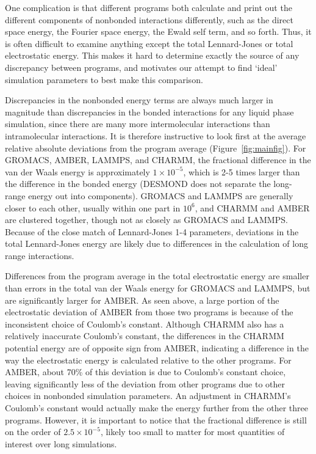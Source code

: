 One complication is that different programs both calculate and print
out the different components of nonbonded interactions differently,
such as the direct space energy, the Fourier space energy, the Ewald
self term, and so forth.  Thus, it is often difficult to examine
anything except the total Lennard-Jones or total electrostatic
energy. This makes it hard to determine exactly the source of any
discrepancy between programs, and motivates our attempt to find
`ideal' simulation parameters to best make this comparison.

Discrepancies in the nonbonded energy terms are always much larger in
magnitude than discrepancies in the bonded interactions for any liquid
phase simulation, since there are many more intermolecular
interactions than intramolecular interactions.  It is therefore
instructive to look first at the average relative absolute deviations
from the program average (Figure~\ref{fig:mainfig}). For GROMACS, AMBER, LAMMPS, and CHARMM, the
fractional difference in the van der Waals energy is approximately
$1\times 10^{-5}$, which is 2-5 times larger than the difference in
the bonded energy (DESMOND does not separate the long-range energy out
into components). GROMACS and LAMMPS are generally closer to each
other, usually within one part in $10^6$, and CHARMM and AMBER are
clustered together, though not as closely as GROMACS and
LAMMPS. Because of the close match of Lennard-Jones 1-4 parameters,
deviations in the total Lennard-Jones energy are likely due to
differences in the calculation of long range interactions.

Differences from the program average in the total electrostatic energy
are smaller than errors in the total van der Waals energy for GROMACS
and LAMMPS, but are significantly larger for AMBER.  As seen above, a
large portion of the electrostatic deviation of AMBER from those two
programs is because of the inconsistent choice of Coulomb's constant.
Although CHARMM also has a relatively inaccurate Coulomb's constant,
the differences in the CHARMM potential energy are of opposite sign from AMBER, indicating a difference in the way the
electrostatic energy is calculated relative to the other programs.  
For AMBER, about 70\% of this deviation is due to 
Coulomb's constant choice, leaving significantly less of the deviation
from other programs due to other choices in nonbonded simulation
parameters. An adjustment in CHARMM's Coulomb's constant would
actually make the energy further from the other three programs.
However, it is important to notice that the fractional difference is
still on the order of $2.5 \times 10^{-5}$, likely too small to matter
for most quantities of interest over long simulations.

